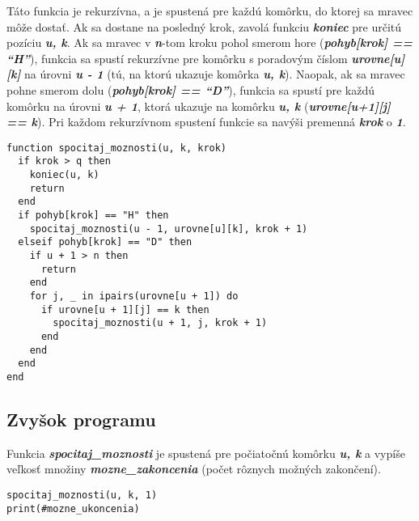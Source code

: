 \documentclass{article}
\begin{document}
Táto funkcia je rekurzívna, a je spustená pre každú komôrku, do ktorej sa mravec môže dostať. Ak sa dostane na posledný krok, zavolá funkciu \textbf{\textit{koniec}} pre určitú pozíciu \textbf{\textit{u, k}}.
Ak sa mravec v \textbf{\textit{n}}-tom kroku pohol smerom hore (\textbf{\textit{pohyb[krok] == ``H''}}), funkcia sa spustí rekurzívne pre komôrku s poradovým číslom \textbf{\textit{urovne[u][k]}} na úrovni \textbf{\textit{u - 1}} (tú, na ktorú ukazuje komôrka \textbf{\textit{u, k}}).
Naopak, ak sa mravec pohne smerom dolu (\textbf{\textit{pohyb[krok] == ``D''}}), funkcia sa spustí pre každú komôrku na úrovni \textbf{\textit{u + 1}}, ktorá ukazuje na komôrku \textbf{\textit{u, k}} (\textbf{\textit{urovne[u+1][j] == k}}).
Pri každom rekurzívnom spustení funkcie sa navýši premenná \textbf{\textit{krok}} o \textbf{\textit{1}}.

\begin{lstlisting}
function spocitaj_moznosti(u, k, krok)
  if krok > q then
    koniec(u, k)
    return
  end
  if pohyb[krok] == "H" then
    spocitaj_moznosti(u - 1, urovne[u][k], krok + 1)
  elseif pohyb[krok] == "D" then
    if u + 1 > n then
      return
    end
    for j, _ in ipairs(urovne[u + 1]) do
      if urovne[u + 1][j] == k then
        spocitaj_moznosti(u + 1, j, krok + 1)
      end
    end
  end
end

\end{lstlisting}

\subsection{Zvyšok programu}

Funkcia \textbf{\textit{spocitaj\_moznosti}} je spustená pre počiatočnú komôrku \textbf{\textit{u, k}} a vypíše veľkosť množiny \textbf{\textit{mozne\_zakoncenia}} (počet rôznych možných zakončení).

\begin{lstlisting}[language={[5.0]Lua}]
spocitaj_moznosti(u, k, 1)
print(#mozne_ukoncenia)
\end{lstlisting}
\end{document}
